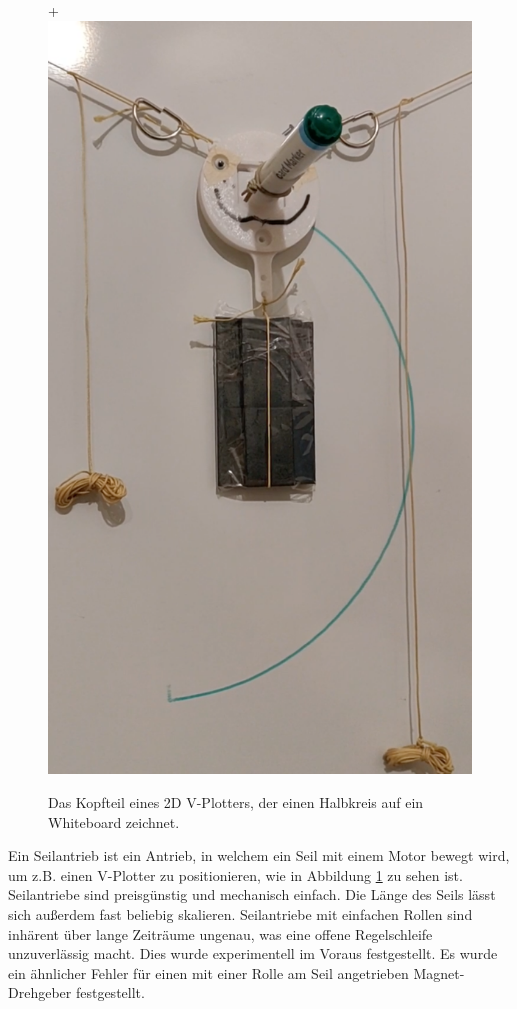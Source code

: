 \documentclass[10pt,a4paper]{scrarticle}
\begin{document}
\begin{figure}[!b]
+  \includegraphics[scale=0.3]{Abbildungen/2D_plotter.png}
  \centering
  \caption{Das Kopfteil eines 2D V-Plotters, der einen Halbkreis auf ein Whiteboard zeichnet.}
  \label{fig:2D_plotter}
\end{figure}

Ein Seilantrieb ist ein Antrieb, in welchem ein Seil mit einem Motor bewegt wird, um z.B. einen V-Plotter zu positionieren, wie in Abbildung \ref{fig:2D_plotter} zu sehen ist. Seilantriebe sind preisgünstig und mechanisch einfach. Die Länge des Seils lässt sich außerdem fast beliebig skalieren. Seilantriebe mit einfachen Rollen sind inhärent über lange Zeiträume ungenau, was eine offene Regelschleife unzuverlässig macht. Dies wurde experimentell im Voraus festgestellt. Es wurde ein ähnlicher Fehler für einen mit einer Rolle am Seil angetrieben Magnet-Drehgeber festgestellt.
\end{document}

